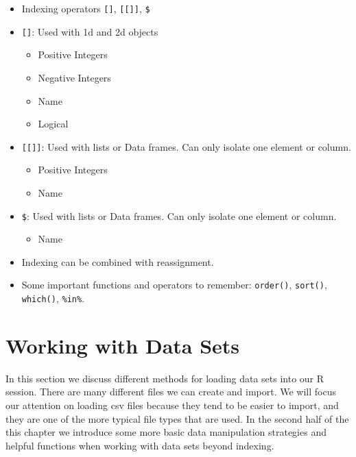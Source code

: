 \documentclass[
]{book}
\providecommand{\tightlist}{%
  \setlength{\itemsep}{0pt}\setlength{\parskip}{0pt}}
\begin{document}
\begin{itemize}
\item
  Indexing operators \texttt{{[}{]}}, \texttt{{[}{[}{]}{]}}, \texttt{\$}
\item
  \texttt{{[}{]}}: Used with 1d and 2d objects

  \begin{itemize}
  \tightlist
  \item
    Positive Integers
  \item
    Negative Integers
  \item
    Name
  \item
    Logical
  \end{itemize}
\item
  \texttt{{[}{[}{]}{]}}: Used with lists or Data frames. Can only isolate one element or column.

  \begin{itemize}
  \tightlist
  \item
    Positive Integers
  \item
    Name
  \end{itemize}
\item
  \texttt{\$}: Used with lists or Data frames. Can only isolate one element or column.

  \begin{itemize}
  \tightlist
  \item
    Name
  \end{itemize}
\item
  Indexing can be combined with reassignment.
\item
  Some important functions and operators to remember: \texttt{order()}, \texttt{sort()}, \texttt{which()}, \texttt{\%in\%}.
\end{itemize}

\hypertarget{working-with-data-sets}{%
\chapter{Working with Data Sets}\label{working-with-data-sets}}

In this section we discuss different methods for loading data sets into our R session. There are many different files we can create and import. We will focus our attention on loading csv files because they tend to be easier to import, and they are one of the more typical file types that are used. In the second half of the this chapter we introduce some more basic data manipulation strategies and helpful functions when working with data sets beyond indexing.
\end{document}
